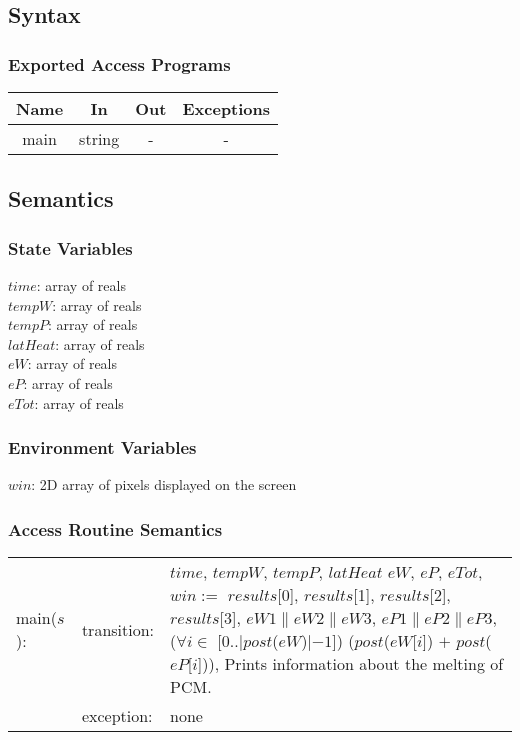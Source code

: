 \documentclass[12pt]{article}
\begin{document}
\subsection{Syntax}
\subsubsection{Exported Access Programs}
\begin{center}
\begin{tabular}{c c c c}
\hline
\textbf{Name} & \textbf{In} & \textbf{Out} & \textbf{Exceptions} \\
\hline
main & string & - & - \\
\hline
\end{tabular}
\end{center}
\subsection{Semantics}
\subsubsection{State Variables}
$time$: array of reals \\
$tempW$: array of reals \\
$tempP$: array of reals \\
$latHeat$: array of reals \\
$eW$: array of reals \\
$eP$: array of reals \\ 
$eTot$: array of reals
\subsubsection{Environment Variables}
$win$: 2D array of pixels displayed on the screen
\subsubsection{Access Routine Semantics}
\begin{tabular}{l l p{12cm}}
main($s$): & transition: & $time$, $tempW$, $tempP$, $latHeat$ $eW$, $eP$, $eTot$, $win :=$ $results$[0], $results$[1], $results$[2], $results$[3], $eW1 \| eW2 \| eW3$, $eP1 \| eP2 \| eP3$, ($\forall i \in$ [0..$|post$($eW$)$| - 1$]) ($post$($eW$[$i$]) $+$ $post$($eP$[$i$])), Prints information about the melting of PCM. \\
& exception: & none \\
\end{tabular}
\end{document}
